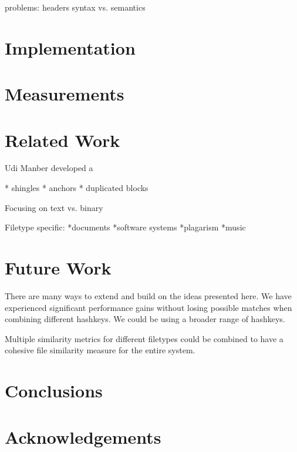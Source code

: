 \documentclass[10pt, twocolumn]{article}
\begin{document}
problems:
headers
syntax vs. semantics


\section{Implementation}

\section{Measurements}


\section{Related Work}

Udi Manber \cite{manber} developed a 

* shingles
* anchors
* duplicated blocks

Focusing on text vs. binary

Filetype specific:
*documents \cite{hpDocRepositories} 
*software systems \cite{sourcecode} 
*plagarism \cite{hoad} \cite{bernstein}
*music \cite{music}



\section{Future Work}

There are many ways to extend and build on the ideas presented here. We have experienced significant performance gains without losing possible matches when combining different hashkeys. We could be using a broader range of hashkeys.

Multiple similarity metrics for different filetypes could be combined to have a cohesive file similarity measure for the entire system.

\section{Conclusions}

\section{Acknowledgements}


\end{document}
